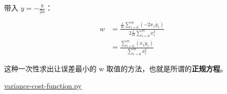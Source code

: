 带入 $y = -\frac{b}{2a}$：

\[
	\begin{aligned}
        w & = \frac {
			\frac{1}{m} \sum\limits^{m}_{i = 0} (-2x_1y_1)
		}{
			2\frac{1}{m} \sum\limits^{m}_{i = 0} x_1^2
		}            \\
		 & = \frac {
			\sum\limits^{m}_{i = 0} (x_1y_1)
		} {
			\sum\limits^{m}_{i = 0} x_1^2
		}
	\end{aligned}
\]

这种一次性求出让误差最小的 w 取值的方法，也就是所谓的\textbf{正规方程}。

\url{variance-cost-function.py}


